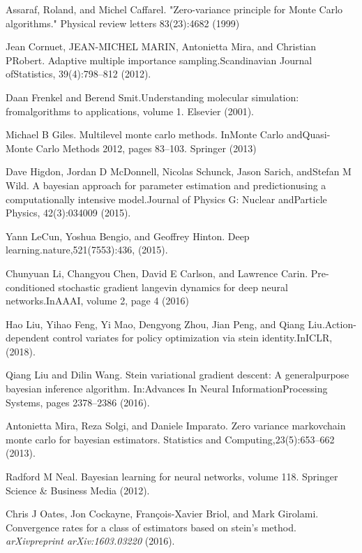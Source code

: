 \documentclass[runningheads]{llncs}
\begin{document}
%
%
\begin{thebibliography}{18}
Assaraf, Roland, and Michel Caffarel. "Zero-variance principle for Monte Carlo algorithms." Physical review letters 83(23):4682 (1999)

Jean Cornuet, JEAN-MICHEL MARIN, Antonietta Mira, and Christian PRobert. Adaptive multiple importance sampling.Scandinavian Journal ofStatistics, 39(4):798–812 (2012).

Daan Frenkel and Berend Smit.Understanding molecular simulation: fromalgorithms to applications, volume 1. Elsevier (2001).

Michael B Giles. Multilevel monte carlo methods. InMonte Carlo andQuasi-Monte Carlo Methods 2012, pages 83–103. Springer (2013)

Dave Higdon, Jordan D McDonnell, Nicolas Schunck, Jason Sarich, andStefan M Wild. A bayesian approach for parameter estimation and predictionusing a computationally intensive model.Journal of Physics G: Nuclear andParticle Physics, 42(3):034009 (2015).

Yann LeCun, Yoshua Bengio, and Geoffrey Hinton. Deep learning.nature,521(7553):436, (2015).

Chunyuan Li, Changyou Chen, David E Carlson, and Lawrence Carin. Pre-conditioned stochastic gradient langevin dynamics for deep neural networks.InAAAI, volume 2, page 4 (2016)

Hao Liu, Yihao Feng, Yi Mao, Dengyong Zhou, Jian Peng, and Qiang Liu.Action-dependent control variates for policy optimization via stein identity.InICLR, (2018).

Qiang Liu and Dilin Wang. Stein variational gradient descent: A generalpurpose bayesian inference algorithm. In:Advances In Neural InformationProcessing Systems, pages 2378–2386 (2016).

Antonietta Mira, Reza Solgi, and Daniele Imparato. Zero variance markovchain monte carlo for bayesian estimators. Statistics and Computing,23(5):653–662 (2013).

Radford M Neal. Bayesian learning for neural networks, volume 118. Springer Science \& Business Media (2012).

Chris J Oates, Jon Cockayne, François-Xavier Briol, and Mark Girolami. Convergence rates for a class of estimators based on stein’s method. \textit{arXivpreprint arXiv:1603.03220} (2016).


\end{thebibliography}
\end{document}
